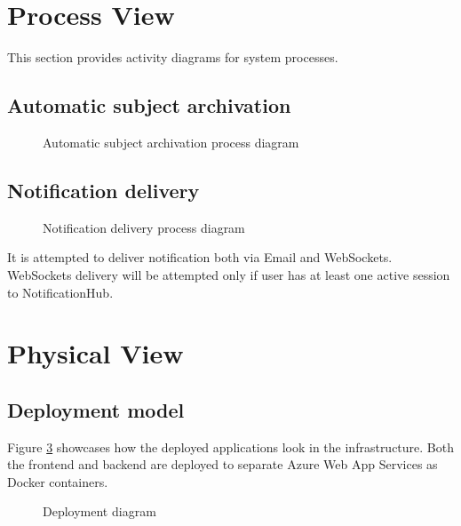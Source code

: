 \documentclass[
    english, %
]{VUMIFPSkursinis}
\begin{document}
\section{Process View}

This section provides activity diagrams for system processes.

\subsection{Automatic subject archivation}

\begin{figure}[ht]
    \centering
    
    \caption{Automatic subject archivation process diagram}
    \label{automatic-archivation-process}
\end{figure}

\subsection{Notification delivery}

\begin{figure}[ht]
    \centering
    
    \caption{Notification delivery process diagram}
    \label{notification-process}
\end{figure}

It is attempted to deliver notification both via Email and WebSockets. WebSockets delivery will be attempted only if user has at least one active session to NotificationHub.

\section{Physical View}

\subsection{Deployment model}

Figure \ref{deployment-diagram} showcases how the deployed applications look in the infrastructure. Both the frontend and backend are deployed to separate Azure Web App Services as Docker containers.

\begin{figure}[ht]
    \centering
    
    \caption{Deployment diagram}
    \label{deployment-diagram}
\end{figure}
\end{document}
